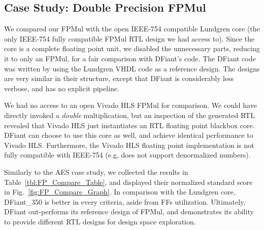           
\subsection{Case Study: Double Precision FPMul}

We compared our FPMul with the open IEEE-754 compatible Lundgren core \cite{lundgren2014open} (the only IEEE-754 fully compatible FPMul RTL design we had access to). Since the core is a complete floating point unit, we disabled the unnecessary parts, reducing it to only an FPMul, for a fair comparison with DFiant's code. The DFiant code was written by using the Lundgren VHDL code as a reference design. The designs are very similar in their structure, except that DFiant is considerably less verbose, and has no explicit pipeline.

We had no access to an open Vivado HLS FPMul for comparison. We could have directly invoked a \textit{double} multiplication, but an inspection of the generated RTL revealed that Vivado HLS just instantiates an RTL floating point blackbox core. DFiant can choose to use this core as well, and achieve identical performance to Vivado HLS. Furthermore, the Vivado HLS floating point implementation is not fully compatible with IEEE-754 (e.g, does not support denormalized numbers).

Similarly to the AES case study, we collected the results in Table~\ref{tbl:FP_Compare_Table}, and displayed their normalized standard score in Fig.~\ref{fig:FP_Compare_Graph}. In comparison with the Lundgren core, DFiant\_350 is better in every criteria, aside from FFs utilization. Ultimately, DFiant out-performs its reference design of FPMul, and demonstrates its ability to provide different RTL designs for design space exploration.

